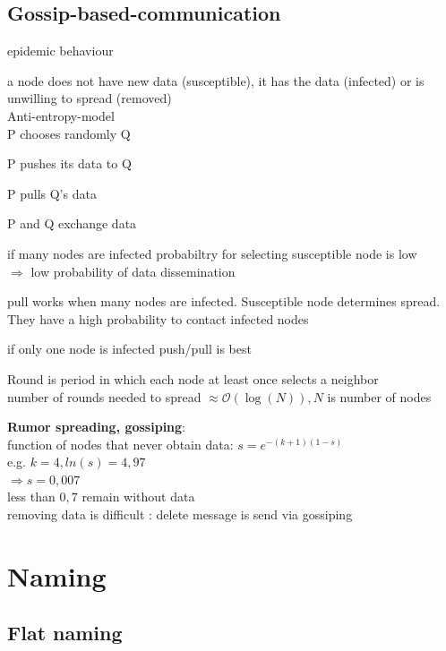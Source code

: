 \documentclass[ngerman,a4paper]{report}
\begin{document}
\section{Gossip-based-communication}
\begin{compactitem}
	\item epidemic behaviour
	\item a node does not have new data (susceptible), it has the data (infected) or is unwilling to spread (removed)\\
	Anti-entropy-model\\
	P chooses randomly Q\\
	\begin{compactenum}
		\item P pushes its data to Q
		\item P pulls Q's data
		\item P and Q exchange data
	\end{compactenum}
	\item if many nodes are infected probabiltry for selecting susceptible node  is low\\
	$\Rightarrow$ low probability of data dissemination\\
	\item pull works when many nodes are infected. Susceptible node determines spread. They have a high probability to contact infected nodes
	\item if only one node is infected push/pull is best
	\item Round is period in which each node at least once selects a neighbor\\
		number of rounds needed to spread  $\approx \mathcal{O}(\log(N)), N$ is number of nodes\\
\end{compactitem}
\textbf{Rumor spreading, gossiping}:\\
function of nodes that never obtain data: $s=e^{-(k+1)(1-s)}$\\
e.g. $k=4, ln(s) = 4,97$\\
$\Rightarrow s = 0,007$\\
less than $0,7$ remain without data\\
removing data is difficult : delete message is send via gossiping

\chapter{Naming}
\section{Flat naming}
\end{document}
